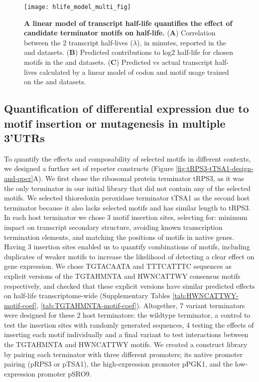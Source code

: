 \documentclass[../main.tex]{subfiles}
\begin{document}
\begin{figure}[p]

{\centering \texttt{[image: hlife\_model\_multi\_fig]} 

}

\caption[A linear model of transcript half-life quantifies the effect of candidate terminator motifs on half-life.]{\textbf{A linear model of transcript half-life quantifies the effect of candidate terminator motifs on half-life.} (\textbf{A}) Correlation between the 2 transcript half-lives (\(\lambda\)), in minutes, reported in the \parencite{Chan2018} and \parencite{Sun2013} datasets. (\textbf{B}) Predicted contributions to log2 half-life for chosen motifs in the \parencite{Chan2018} and \parencite{Sun2013} datasets. (\textbf{C}) Predicted vs actual transcript half-lives calculated by a linear model of codon and motif usage trained on the \parencite{Chan2018} and \parencite{Sun2013} datasets.}\label{fig:hlife-decay-model}
\end{figure}

\subsection{Quantification of differential expression due to motif insertion or mutagenesis in multiple 3'UTRs}

To quantify the effects and composability of selected motifs in different contexts, we designed a further set of reporter constructs (Figure \ref{fig:tRPS3-tTSA1-design-and-qpcr}A).
We first chose the ribosomal protein terminator tRPS3, as it was the only terminator in our initial library that did not contain any of the selected motifs.
We selected thioredoxin peroxidase terminator tTSA1 as the second host terminator because it also lacks selected motifs and has similar length to tRPS3.
In each host terminator we chose 3 motif insertion sites, selecting for: minimum impact on transcript secondary structure, avoiding known transcription termination elements, and matching the positions of motifs in native genes.
Having 3 insertion sites enabled us to quantify combinations of motifs, including duplicates of weaker motifs to increase the likelihood of detecting a clear effect on gene expression.
We chose TGTACAATA and TTTCATTTC sequences as explicit versions of the TGTAHMNTA and HWNCATTWY consensus motifs respectively, and checked that these explicit versions have similar predicted effects on half-life transcriptome-wide (Supplementary Tables \ref{tab:HWNCATTWY-motif-coef}, \ref{tab:TGTAHMNTA-motif-coef}).
Altogether, 7 variant terminators were designed for these 2 host terminators: the wildtype terminator, a control to test the insertion sites with randomly generated sequences, 4 testing the effects of inserting each motif individually and a final variant to test interactions between the TGTAHMNTA and HWNCATTWY motifs.
We created a construct library by pairing each terminator with three different promoters; its native promoter pairing (pRPS3 or pTSA1), the high-expression promoter pPGK1, and the low-expression promoter pSRO9.
\end{document}
